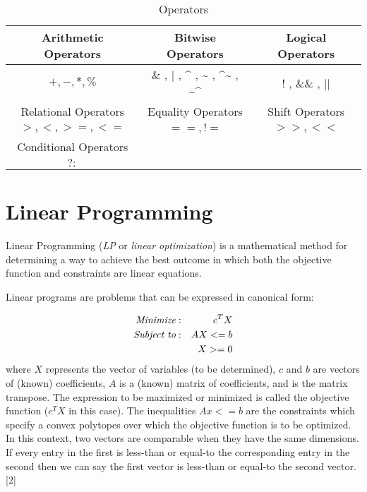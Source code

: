 \documentclass[conference,11pt]{IEEEtran}
\begin{document}
\begin{table}[!t]
\caption{Operators}
\label{work}
\centering
\begin{tabular}{|c|c|c|}
\hline
Arithmetic Operators& Bitwise Operators & Logical Operators \\
\hline

$+, -, *,  \% $ &   \& , $\vert$ , \^{} , \~{} , \^{}\~{} , \~{}\^{}   & ! , \&\& , $\vert$$\vert$  \\
\hline
\hline
Relational Operators& Equality Operators & Shift Operators \\
\hline
$>, < , >= , <= $ &   $ == , != $   & $ >> , << $  \\
\hline
\hline
Conditional Operators&& \\
\hline
$?: $ &&\\
\hline
\end{tabular}
\end{table}

\section{Linear Programming}
Linear Programming (\emph{LP} or \emph{linear optimization}) is a mathematical method for determining a way to achieve the best outcome in which both the objective function and constraints are linear equations.

Linear programs are problems that can be expressed in canonical form:

\begin{eqnarray*}
\emph{Minimize} & : & c^T X\\
\emph{Subject  to} & : & AX <= b\\
 & & X>=0\\
\end{eqnarray*}
where $X$ represents the vector of variables (to be determined), $c$ and $b$ are vectors of (known) coefficients, $A$ is a (known) matrix of coefficients, and is the matrix transpose. The expression to be maximized or minimized is called the objective function ($c^T X$ in this case). The inequalities $Ax <= b$ are the constraints which specify a convex polytopes over which the objective function is to be optimized. In this context, two vectors are comparable when they have the same dimensions. If every entry in the first is less-than or equal-to the corresponding entry in the second then we can say the first vector is less-than or equal-to the second vector.[2]
\end{document}
